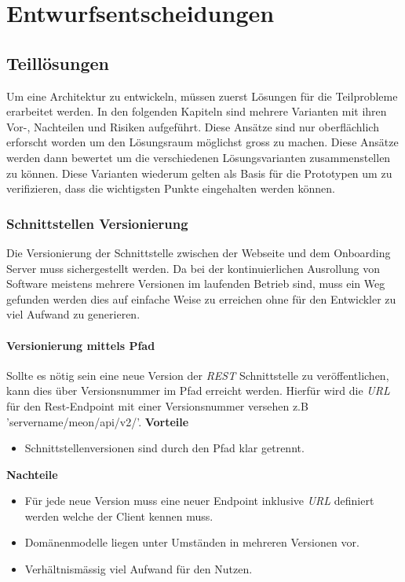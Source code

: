 
\chapter{Entwurfsentscheidungen}
\label{entwurfsentscheidungen}
\section{Teillösungen}

Um eine Architektur zu entwickeln, müssen zuerst Lösungen für die Teilprobleme erarbeitet werden. In den folgenden Kapiteln sind mehrere Varianten mit ihren Vor-, Nachteilen und Risiken aufgeführt. Diese Ansätze sind nur oberflächlich erforscht worden um den Lösungsraum möglichst gross zu machen. Diese Ansätze werden dann bewertet um die verschiedenen Lösungsvarianten zusammenstellen zu können. Diese Varianten wiederum gelten als Basis für die Prototypen um zu verifizieren, dass die wichtigsten Punkte eingehalten werden können. 

\subsection{Schnittstellen Versionierung}

Die Versionierung der Schnittstelle zwischen der Webseite und dem Onboarding Server muss sichergestellt werden. Da bei der kontinuierlichen Ausrollung von Software meistens mehrere Versionen im laufenden Betrieb sind, muss ein Weg gefunden werden dies auf einfache Weise zu erreichen ohne für den Entwickler zu viel Aufwand zu generieren.

\subsubsection{Versionierung mittels Pfad}

Sollte es nötig sein eine neue Version der \textit{\gls{REST}} Schnittstelle zu veröffentlichen, kann dies über Versionsnummer im Pfad erreicht werden. Hierfür wird die \textit{\gls{URL}} für den Rest-Endpoint mit einer Versionsnummer versehen z.B 'servername/meon/api/v2/'.
\newline
\newline
\textbf{Vorteile}
\begin{itemize}
	\item Schnittstellenversionen sind durch den Pfad klar getrennt.
\end{itemize}
\textbf{Nachteile}
\begin{itemize}
	\item Für jede neue Version muss eine neuer Endpoint inklusive \textit{\gls{URL}} definiert werden welche der Client kennen muss.
	\item Domänenmodelle liegen unter Umständen in mehreren Versionen vor.
	\item Verhältnismässig viel Aufwand für den Nutzen.
\end{itemize}
\newpage
